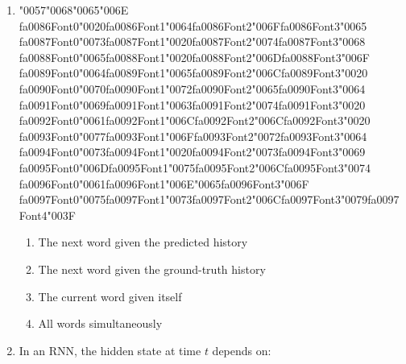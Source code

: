 \documentclass[12pt]{article}
\begin{document}
\begin{enumerate}[label=Q\arabic*.]
\item {\char"0057}{\char"0068}{\char"0065}{\char"006E} {\csname fa0086Font0\endcsname\char"0020}{\csname fa0086Font1\endcsname\char"0064}{\csname fa0086Font2\endcsname\char"006F}{\csname fa0086Font3\endcsname\char"0065} {\csname fa0087Font0\endcsname\char"0073}{\csname fa0087Font1\endcsname\char"0020}{\csname fa0087Font2\endcsname\char"0074}{\csname fa0087Font3\endcsname\char"0068} {\csname fa0088Font0\endcsname\char"0065}{\csname fa0088Font1\endcsname\char"0020}{\csname fa0088Font2\endcsname\char"006D}{\csname fa0088Font3\endcsname\char"006F} {\csname fa0089Font0\endcsname\char"0064}{\csname fa0089Font1\endcsname\char"0065}{\csname fa0089Font2\endcsname\char"006C}{\csname fa0089Font3\endcsname\char"0020} {\csname fa0090Font0\endcsname\char"0070}{\csname fa0090Font1\endcsname\char"0072}{\csname fa0090Font2\endcsname\char"0065}{\csname fa0090Font3\endcsname\char"0064} {\csname fa0091Font0\endcsname\char"0069}{\csname fa0091Font1\endcsname\char"0063}{\csname fa0091Font2\endcsname\char"0074}{\csname fa0091Font3\endcsname\char"0020} {\csname fa0092Font0\endcsname\char"0061}{\csname fa0092Font1\endcsname\char"006C}{\csname fa0092Font2\endcsname\char"006C}{\csname fa0092Font3\endcsname\char"0020} {\csname fa0093Font0\endcsname\char"0077}{\csname fa0093Font1\endcsname\char"006F}{\csname fa0093Font2\endcsname\char"0072}{\csname fa0093Font3\endcsname\char"0064} {\csname fa0094Font0\endcsname\char"0073}{\csname fa0094Font1\endcsname\char"0020}{\csname fa0094Font2\endcsname\char"0073}{\csname fa0094Font3\endcsname\char"0069} {\csname fa0095Font0\endcsname\char"006D}{\csname fa0095Font1\endcsname\char"0075}{\csname fa0095Font2\endcsname\char"006C}{\csname fa0095Font3\endcsname\char"0074} {\csname fa0096Font0\endcsname\char"0061}{\csname fa0096Font1\endcsname\char"006E}{\char"0065}{\csname fa0096Font3\endcsname\char"006F} {\csname fa0097Font0\endcsname\char"0075}{\csname fa0097Font1\endcsname\char"0073}{\csname fa0097Font2\endcsname\char"006C}{\csname fa0097Font3\endcsname\char"0079}{\csname fa0097Font4\endcsname\char"003F}
\begin{enumerate}[label=(\Alph*)]
    \item The next word given the predicted history
    \item The next word given the ground-truth history
    \item The current word given itself
    \item All words simultaneously
\end{enumerate}
\item In an RNN, the hidden state at time $t$ depends on:

\end{enumerate}
\end{document}
